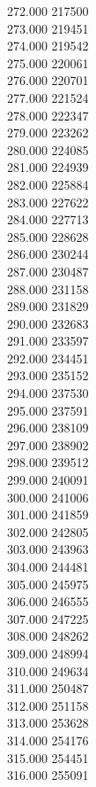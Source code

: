 { 272.000	217500 \\
 273.000	219451 \\
 274.000	219542 \\
 275.000	220061 \\
 276.000	220701 \\
 277.000	221524 \\
 278.000	222347 \\
 279.000	223262 \\
 280.000	224085 \\
 281.000	224939 \\
 282.000	225884 \\
 283.000	227622 \\
 284.000	227713 \\
 285.000	228628 \\
 286.000	230244 \\
 287.000	230487 \\
 288.000	231158 \\
 289.000	231829 \\
 290.000	232683 \\
 291.000	233597 \\
 292.000	234451 \\
 293.000	235152 \\
 294.000	237530 \\
 295.000	237591 \\
 296.000	238109 \\
 297.000	238902 \\
 298.000	239512 \\
 299.000	240091 \\
 300.000	241006 \\
 301.000	241859 \\
 302.000	242805 \\
 303.000	243963 \\
 304.000	244481 \\
 305.000	245975 \\
 306.000	246555 \\
 307.000	247225 \\
 308.000	248262 \\
 309.000	248994 \\
 310.000	249634 \\
 311.000	250487 \\
 312.000	251158 \\
 313.000	253628 \\
 314.000	254176 \\
 315.000	254451 \\
 316.000	255091 \\
}
